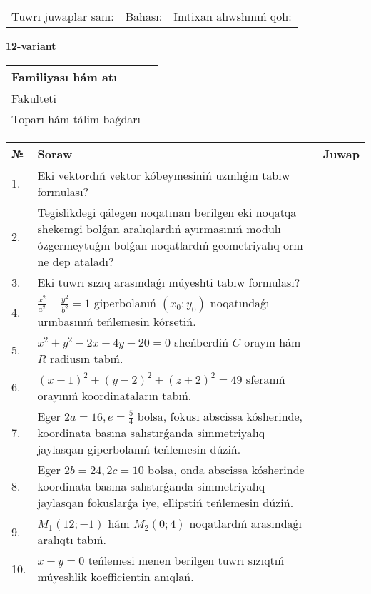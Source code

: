 \documentclass{article}
\begin{document}
\vspace{1cm}

\begin{tabular}{lll}
Tuwrı juwaplar sanı: \underline{\hspace{1.5cm}} & 
Bahası: \underline{\hspace{1.5cm}} & 
Imtixan alıwshınıń qolı: \underline{\hspace{2cm}} \\
\end{tabular}

\egroup

\newpage


\textbf{12-variant}\\

\bgroup
\def\arraystretch{1.6} %

\begin{tabular}{|m{5.7cm}|m{9.5cm}|}
\hline
Familiyası hám atı & \\
\hline
Fakulteti  & \\
\hline
Toparı hám tálim baǵdarı  & \\
\hline
\end{tabular}

\vspace{1cm}

\begin{tabular}{|m{0.7cm}|m{10cm}|m{4cm}|}
\hline
№ & Soraw & Juwap \\
\hline
1. & Eki vektordıń vektor kóbeymesiniń uzınlıǵın tabıw formulası? &  \\
\hline
2. & Tegislikdegi qálegen noqatınan berilgen eki noqatqa shekemgi bolǵan aralıqlardıń ayırmasınıń modulı ózgermeytuǵın bolǵan noqatlardıń geometriyalıq ornı ne dep ataladı? &  \\
\hline
3. & Eki tuwrı sızıq arasındaǵı múyeshti tabıw formulası? &  \\
\hline
4. & $\frac{x^2}{a^2}-\frac{y^2}{b^2}=1$ giperbolanıń $(x_0;y_0)$ noqatındaǵı urınbasınıń teńlemesin kórsetiń. &  \\
\hline
5. & $x^{2}+y^{2}-2x+4y-20=0$ sheńberdiń $C$ orayın hám $R$ radiusın tabıń. &  \\
\hline
6. & $(x+1)^{2}+(y-2) ^{2}+(z+2) ^{2}=49$ sferanıń orayınıń koordinataların tabıń. &  \\
\hline
7. & Eger $2a=16, e=\frac{5}{4}$ bolsa, fokusı abscissa kósherinde, koordinata basına salıstırǵanda simmetriyalıq jaylasqan giperbolanıń teńlemesin dúziń. &  \\
\hline
8. & Eger $2b=24, 2 c=10$ bolsa, onda abscissa kósherinde koordinata basına salıstırǵanda simmetriyalıq jaylasqan fokuslarǵa iye, ellipstiń teńlemesin dúziń. &  \\
\hline
9. & $M_{1} (12;-1)$ hám $M_{2} (0;4)$ noqatlardıń arasındaǵı aralıqtı tabıń. &  \\
\hline
10. & $x+y=0$ teńlemesi menen berilgen tuwrı sızıqtıń múyeshlik koefficientin anıqlań. &  \\
\hline
\end{tabular}
\end{document}
